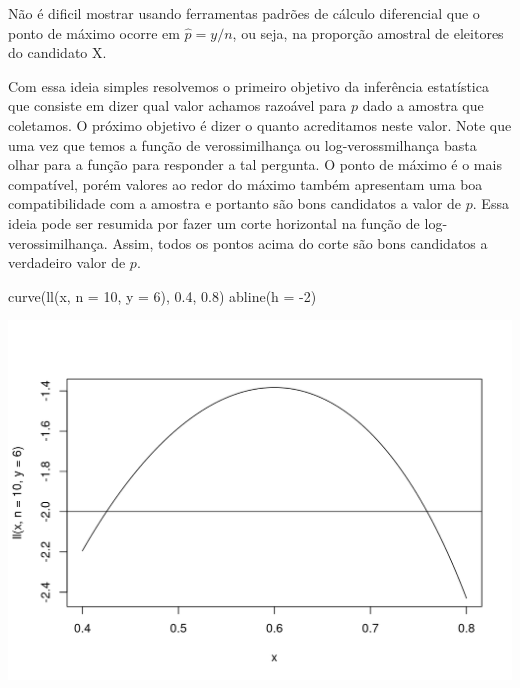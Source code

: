 \documentclass[
  10pt,
  a4paper]{book}
\newenvironment{Shaded}{\begin{snugshade}}{\end{snugshade}}
\newcommand{\AttributeTok}[1]{\textcolor[rgb]{0.77,0.63,0.00}{#1}}
\newcommand{\DecValTok}[1]{\textcolor[rgb]{0.00,0.00,0.81}{#1}}
\newcommand{\FloatTok}[1]{\textcolor[rgb]{0.00,0.00,0.81}{#1}}
\newcommand{\FunctionTok}[1]{\textcolor[rgb]{0.00,0.00,0.00}{#1}}
\newcommand{\NormalTok}[1]{#1}
\newcommand{\SpecialCharTok}[1]{\textcolor[rgb]{0.00,0.00,0.00}{#1}}
\begin{document}
Não é dificil mostrar usando ferramentas padrões de cálculo diferencial que o ponto de máximo ocorre em \(\hat{p} = y/n\), ou seja, na proporção amostral de eleitores do candidato X.

Com essa ideia simples resolvemos o primeiro objetivo da inferência estatística que consiste em dizer qual valor achamos razoável para \(p\) dado a amostra que coletamos.
O próximo objetivo é dizer o quanto acreditamos neste valor. Note que uma vez que temos a função de verossimilhança ou log-verossmilhança basta olhar para a função para responder a tal pergunta. O ponto de máximo é o mais compatível, porém valores ao redor do máximo também apresentam uma boa compatibilidade com a amostra e portanto são bons candidatos a valor de \(p\). Essa ideia pode ser resumida por fazer um corte horizontal na função de log-verossimilhança. Assim, todos os pontos acima do corte são bons candidatos a verdadeiro valor de \(p\).

\begin{Shaded}
\begin{Highlighting}[]
\FunctionTok{curve}\NormalTok{(}\FunctionTok{ll}\NormalTok{(x, }\AttributeTok{n =} \DecValTok{10}\NormalTok{, }\AttributeTok{y =} \DecValTok{6}\NormalTok{), }\FloatTok{0.4}\NormalTok{, }\FloatTok{0.8}\NormalTok{)}
\FunctionTok{abline}\NormalTok{(}\AttributeTok{h =} \SpecialCharTok{{-}}\DecValTok{2}\NormalTok{)}
\end{Highlighting}
\end{Shaded}

\begin{center}\includegraphics{figures/unnamed-chunk-376-1} \end{center}
\end{document}
